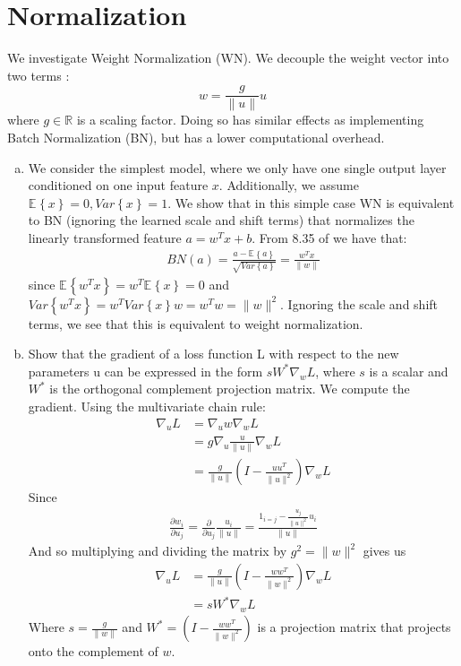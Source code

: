 \documentclass[paper=a4, fontsize=11pt]{scrartcl} %
\numberwithin{equation}{section} %
\numberwithin{figure}{section} %
\numberwithin{table}{section} %
\newcommand{\Ex}[2]{\mathbb{E}_{#1}\left\{#2\right\}}
\newcommand{\dP}[2]{\frac{\partial #1}{\partial #2}}
\newcommand{\Var}[1]{Var\left\{#1\right\}}
\begin{document}
\section{Normalization}
We investigate Weight Normalization (WN). We decouple the weight vector into two terms : 
$$ w = \frac{g}{\|u\|}u $$
where $g\in\mathbb{R}$ is a scaling factor. Doing so has similar effects as implementing Batch Normalization (BN), but has a lower computational overhead.
\begin{enumerate}[(a)]
	\item We consider the simplest model, where we only have one single output layer conditioned on one input feature $x$. Additionally, we assume $\Ex{}{x}=0, \Var{x}=1$. We show that in this simple case WN is equivalent to BN (ignoring the learned scale and shift terms) that normalizes the linearly transformed feature $a=w^Tx+b$. From 8.35 of \cite{Goodfellow-et-al-2016} we have that:
	\begin{align*}
	BN(a) = \frac{a-\Ex{}{a}}{\sqrt{\Var{a}}} = \frac{w^Tx}{\|w\|}
	\end{align*}
	since $\Ex{}{w^Tx}=w^T\Ex{}{x}=0$ and $\Var{w^Tx}=w^T\Var{x}w=w^Tw=\|w\|^2$.
	Ignoring the scale and shift terms, we see that this is equivalent to weight normalization.
	\item Show that the gradient of a loss function L with respect to the new parameters u can be expressed in the form $sW^*\nabla_w L$, where $s$ is a scalar and $W^*$ is the orthogonal complement projection matrix. We compute the gradient. Using the multivariate chain rule:
	\begin{align*}
		\nabla_u L &= \nabla_u w \nabla_w L\\
		&= g \nabla_u \frac{u}{\|u\|} \nabla_w L\\
		&= \frac{g}{\|u\|} \left( I- \frac{uu^T}{\|u\|^2} \right) \nabla_w L
	\end{align*}
	Since 
	\begin{align*}
	\dP{w_i}{u_j} = \dP{}{u_j}\frac{u_i}{\|u\|} = \frac{1_{i=j}-\frac{u_j}{\|u\|^2}u_i}{\|u\|}
	\end{align*}
	And so multiplying and dividing the matrix by $g^2=\|w\|^2$ gives us
	\begin{align*}
		\nabla_u L &= \frac{g}{\|u\|} \left( I- \frac{ww^T}{\|w\|^2} \right) \nabla_w L \\
		&= s W^* \nabla_w L
	\end{align*}
	Where $s=\frac{g}{\|w\|}$ and $W^* = \left( I- \frac{ww^T}{\|w\|^2} \right)$ is a projection matrix that projects onto the complement of $w$.

\end{enumerate}
\end{document}
